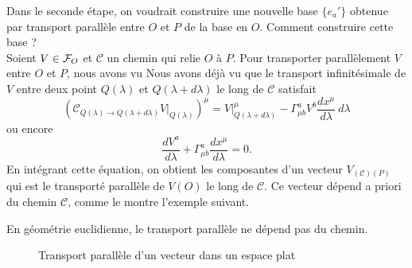 \documentclass[a4paper,11pt]{report}
\begin{document}
                Dans le seconde étape, on voudrait construire une nouvelle base $\{e_a'\}$ obtenue par transport parallèle entre $O$ et $P$ de la base en $O$. Comment construire cette base ?\\
                Soient $V\in\mathcal{F}_O$ et $\mathscr{C}$ un chemin qui relie $O$ à $P$. Pour transporter parallèlement $V$ entre $O$ et $P$, nous avons vu Nous avons déjà vu que le transport infinitésimale de $V$ entre deux point $Q(\lambda)$ et $Q(\lambda+d\lambda)$ le long de $\mathscr{C}$ satisfait
                \begin{equation}
                    \left(\mathscr{C}_{Q(\lambda)\to Q(\lambda+d\lambda)}V|_{Q(\lambda)}\right)^\mu = V|_{Q(\lambda+d\lambda)}^\mu-\Gamma^a_{\mu b}V^b \frac{dx^\mu}{d\lambda} ~d\lambda
                \end{equation}
                ou encore 
                \begin{equation}\label{eq:transportv}
                    \frac{dV^a}{d\lambda} + \Gamma^a_{\mu b}\frac{dx^\mu}{d\lambda} = 0.
                \end{equation}
                En intégrant cette équation, on obtient les composantes d'un vecteur $V_{(\mathscr{C})(P)}$ qui est le transporté parallèle de $V(O)$ le long de $\mathscr{C}$. Ce vecteur dépend a priori du chemin $\mathscr{C}$, comme le montre l'exemple suivant.
                
                \begin{exmp}
                    En géométrie euclidienne, le transport parallèle ne dépend pas du chemin.
                    \begin{figure}[H]
                        \centering
                        \caption{Transport parallèle d'un vecteur dans un espace plat}
                        \label{fig:my_label}
                    \end{figure}
                \end{exmp}
                
\end{document}
